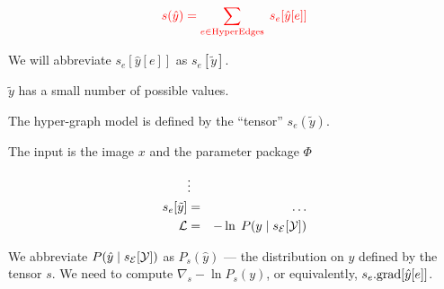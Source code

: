 \vfill

$${\color{red} s(\hat{y}) = \sum_{e \in \mathrm{HyperEdges}}  \; s_e[\hat{y}[e]]}$$



We will abbreviate $s_e[\hat{y}[e]]$ as {\color{red} $s_e[\tilde{y}]$}.

\vfill
{\color{red} $\tilde{y}$ has a small number of possible values.}

\vfill
The hyper-graph model is defined by the ``tensor'' {\color{red} $s_e(\tilde{y})$}.



The input is the image $x$ and the parameter package $\Phi$

\begin{eqnarray*}
 & \vdots & \\
s_e[\tilde{y}] & = & \ldots \\
{\cal L} & = & - \ln\; P(y\;|\;s_{\cal E}[{\cal Y}])
\end{eqnarray*}

\vfill We abbreviate $P(\hat{y}\;|\;s_{\cal E}[{\cal Y}])$ as {\color{red} $P_s(\hat{y})$} --- the distribution on $\hat{y}$ defined by the tensor $s$.
\vfill
We need to compute {\color{red} $\nabla_s -\ln P_s(y)$}, or equivalently, {\color{red} $s_e.\mathrm{grad}[\hat{y}[e]]$}.

